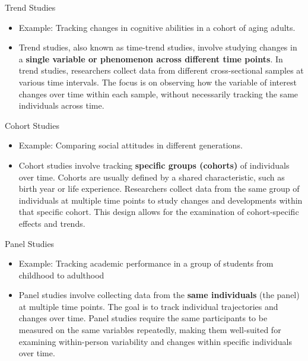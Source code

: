 \documentclass[
  ignorenonframetext,
  aspectratio=169,
]{beamer}
\providecommand{\tightlist}{%
  \setlength{\itemsep}{0pt}\setlength{\parskip}{0pt}}\usepackage{longtable,booktabs,array}
\begin{document}
\begin{frame}{Trend Studies}
\label{trend-studies}
\begin{itemize}[<+->]
\tightlist
\item
  Example: Tracking changes in cognitive abilities in a cohort of aging
  adults.
\item
  Trend studies, also known as time-trend studies, involve studying
  changes in a \textbf{single variable or phenomenon across different
  time points}. In trend studies, researchers collect data from
  different cross-sectional samples at various time intervals. The focus
  is on observing how the variable of interest changes over time within
  each sample, without necessarily tracking the same individuals across
  time.
\end{itemize}
\end{frame}

\begin{frame}{Cohort Studies}
\label{cohort-studies}
\begin{itemize}[<+->]
\tightlist
\item
  Example: Comparing social attitudes in different generations.
\item
  Cohort studies involve tracking \textbf{specific groups (cohorts)} of
  individuals over time. Cohorts are usually defined by a shared
  characteristic, such as birth year or life experience. Researchers
  collect data from the same group of individuals at multiple time
  points to study changes and developments within that specific cohort.
  This design allows for the examination of cohort-specific effects and
  trends.
\end{itemize}
\end{frame}

\begin{frame}{Panel Studies}
\label{panel-studies}
\begin{itemize}[<+->]
\tightlist
\item
  Example: Tracking academic performance in a group of students from
  childhood to adulthood
\item
  Panel studies involve collecting data from the \textbf{same
  individuals} (the panel) at multiple time points. The goal is to track
  individual trajectories and changes over time. Panel studies require
  the same participants to be measured on the same variables repeatedly,
  making them well-suited for examining within-person variability and
  changes within specific individuals over time.
\end{itemize}
\end{frame}
\end{document}
